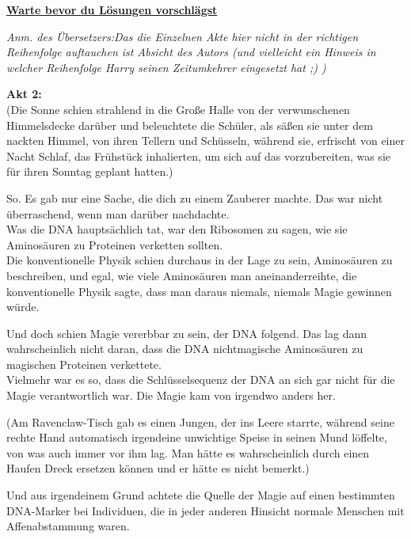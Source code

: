 

\hypertarget{warte-bevor-du-luxf6sungen-vorschluxe4gst}{%

\textbf{\uline{Warte bevor du Lösungen vorschlägst}}

\emph{Anm. des Übersetzers:Das die Einzelnen Akte hier nicht in der richtigen Reihenfolge auftauchen ist Absicht des Autors (und vielleicht ein Hinweis in welcher Reihenfolge Harry seinen Zeitumkehrer eingesetzt hat ;) )}

\textbf{Akt 2:}\\ (Die Sonne schien strahlend in die Große Halle von der verwunschenen Himmelsdecke darüber und beleuchtete die Schüler, als säßen sie unter dem nackten Himmel, von ihren Tellern und Schüsseln, während sie, erfrischt von einer Nacht Schlaf, das Frühstück inhalierten, um sich auf das vorzubereiten, was sie für ihren Sonntag geplant hatten.)

So. Es gab nur eine Sache, die dich zu einem Zauberer machte. Das war nicht überraschend, wenn man darüber nachdachte.\\ Was die DNA hauptsächlich tat, war den Ribosomen zu sagen, wie sie Aminosäuren zu Proteinen verketten sollten.\\ Die konventionelle Physik schien durchaus in der Lage zu sein, Aminosäuren zu beschreiben, und egal, wie viele Aminosäuren man aneinanderreihte, die konventionelle Physik sagte, dass man daraus niemals, niemals Magie gewinnen würde.

Und doch schien Magie vererbbar zu sein, der DNA folgend. Das lag dann wahrscheinlich nicht daran, dass die DNA nichtmagische Aminosäuren zu magischen Proteinen verkettete.\\ Vielmehr war es so, dass die Schlüsselsequenz der DNA an sich gar nicht für die Magie verantwortlich war. Die Magie kam von irgendwo anders her.

(Am Ravenclaw-Tisch gab es einen Jungen, der ins Leere starrte, während seine rechte Hand automatisch irgendeine unwichtige Speise in seinen Mund löffelte, von was auch immer vor ihm lag. Man hätte es wahrscheinlich durch einen Haufen Dreck ersetzen können und er hätte es nicht bemerkt.)

Und aus irgendeinem Grund achtete die Quelle der Magie auf einen bestimmten DNA-Marker bei Individuen, die in jeder anderen Hinsicht normale Menschen mit Affenabstammung waren.

}

